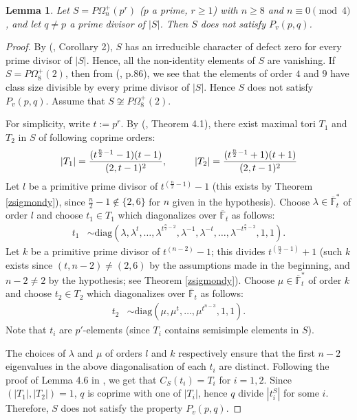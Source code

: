 \documentclass[11pt, a4paper]{article}
\numberwithin{equation}{section}
\theoremstyle{plain} %
\newtheorem{lemma}[theorem]{Lemma}
\begin{document}
\begin{lemma}\label{lemma_orthogonal} 
Let $S=P\Omega_n^+(p^r)$ ($p$ a prime, $r\ge 1$) with $n\ge 8$ and $n\equiv 0\pmod{4}$, and let  $q\neq p$ a prime divisor of $|S|$. Then $S$ does not satisfy $P_v(p,q)$. 
\end{lemma}
\begin{proof} By (\cite{MR1321575}, Corollary 2), $S$ has an irreducible character of defect zero for every prime divisor of $|S|$. Hence, all the non-identity elements of $S$ are vanishing. If $S=P\Omega_8^+(2)$, then from (\cite{MR827219}, p.86), we see that the elements of order $4$ and $9$ have class size divisible by every prime divisor of $|S|$. Hence $S$ does not satisfy $P_v(p,q)$. Assume that $S\not\cong P\Omega_8^+(2)$.

For simplicity, write $t:=p^r.$
By (\cite {MR2507573}, Theorem 4.1), there exist maximal tori $T_1$ and $T_2$ in $S$ of following coprime orders:
$$
|T_1|=\frac{(t^{\frac{n}{2}-1} -1)(t-1)}{(2,t-1)^2}, \hskip10mm 
|T_2|=\frac{(t^{\frac{n}{2}-1} +1)(t+1)}{(2,t-1)^2}
$$
Let $l$ be a primitive prime divisor of $t^{(\frac{n}{2}-1)}-1$ (this exists by Theorem \ref{zsigmondy}), since $\frac{n}{2}-1\notin \{2,6\}$ for $n$ given in the hypothesis). Choose $\lambda\in\overline{\mathbb{F}}_t^*$ of order $l$ and choose $t_1\in T_1$ which  diagonalizes over $\overline{\mathbb{F}}_t$ as follows: 
\begin{align*}
t_1 &\sim \mbox{diag}(\lambda, \lambda^t, \ldots, \lambda^{t^{\frac{n}{2}-2}}, 
\lambda^{-1}, \lambda^{-t}, \ldots, \lambda^{-t^{\frac{n}{2}-2}}, 1,1).
\end{align*}
Let $k$ be a primitive prime divisor of $t^{(n-2)}-1$; this divides $t^{(\frac{n}{2}-1)}+1$ (such $k$ exists since 
$(t,n-2)\neq (2,6)$ by the assumptions made in the beginning, and $n-2\neq 2$ by the hypothesis; see Theorem \ref{zsigmondy}).  Choose $\mu\in\overline{\mathbb{F}}_t^*$ of order $k$ and choose $t_2\in T_2$ which  diagonalizes over $\overline{\mathbb{F}}_t$ as follows: 
\begin{align*}
t_2 &\sim \mbox{diag}(\mu, \mu^t, \ldots, \mu^{t^{n-3}}, 1,1).
\end{align*}
Note that $t_i$ are $p'$-elements (since $T_i$ contains semisimple elements in $S$). 


The choices of $\lambda$ and $\mu$ of orders $l$ and $k$ respectively ensure that the first $n-2$ eigenvalues in the above diagonalisation of each $t_i$ are distinct. Following the proof of Lemma 4.6 in \cite{MR2507573}, we get that 
$C_S(t_i)=T_i$ for $i=1,2$. Since $(|T_1|, |T_2|)=1$, $q$ is coprime with one of $|T_i|$, hence $q$ divide $|t_i^S|$ for some $i$. Therefore, $S$ does not satisfy the property $P_v(p,q)$.
\end{proof}
\end{document}
